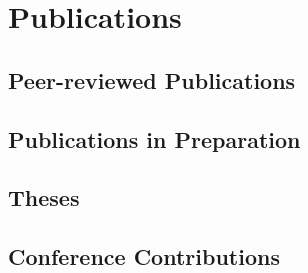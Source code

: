 \ifacademic
    \section{Publications}
        \subsection{Peer-reviewed Publications}
        \begin{refsection}
        	\vspace{2mm}
            \nocite{
                Breinl2017,
                GironsLopez2017,
                GironsLopez2017a,
                GironsLopez2016a,
                Mbanguka2016,
                GironsLopez2015
            }
            \printbibliography[heading=none]
        \end{refsection}
        \subsection{Publications in Preparation}
        \begin{refsection}
        	\vspace{2mm}
            \nocite{
                Rivera2017,
                Rivera2017a
            }
            \printbibliography[heading=none]
        \end{refsection}
        \subsection{Theses}
        \begin{refsection}
        	\vspace{2mm}
            \nocite{
                GironsLopez2016,
                GironsLopez2011
            }
            \printbibliography[heading=none]
        \end{refsection}
        \subsection{Conference Contributions}
        \begin{refsection}
        	\vspace{2mm}
            \nocite{
                Breinl2017a,
                GironsLopez2017b,
                GironsLopez2017c,
                GironsLopez2016b,
                GironsLopez2016c,
                Rivera2016,
                Rivera2015,
                GironsLopez2013,
                Mbanguka2013
            }
            \printbibliography[heading=none]
        \end{refsection}
\else
    \ifswedish
